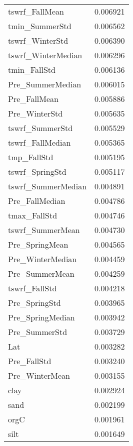 \begin{tabular}{lr}
tswrf_FallMean & 0.006921 \\
tmin_SummerStd & 0.006562 \\
tswrf_WinterStd & 0.006390 \\
tswrf_WinterMedian & 0.006296 \\
tmin_FallStd & 0.006136 \\
Pre_SummerMedian & 0.006015 \\
Pre_FallMean & 0.005886 \\
Pre_WinterStd & 0.005635 \\
tswrf_SummerStd & 0.005529 \\
tswrf_FallMedian & 0.005365 \\
tmp_FallStd & 0.005195 \\
tswrf_SpringStd & 0.005117 \\
tswrf_SummerMedian & 0.004891 \\
Pre_FallMedian & 0.004786 \\
tmax_FallStd & 0.004746 \\
tswrf_SummerMean & 0.004730 \\
Pre_SpringMean & 0.004565 \\
Pre_WinterMedian & 0.004459 \\
Pre_SummerMean & 0.004259 \\
tswrf_FallStd & 0.004218 \\
Pre_SpringStd & 0.003965 \\
Pre_SpringMedian & 0.003942 \\
Pre_SummerStd & 0.003729 \\
Lat & 0.003282 \\
Pre_FallStd & 0.003240 \\
Pre_WinterMean & 0.003155 \\
clay & 0.002924 \\
sand & 0.002199 \\
orgC & 0.001961 \\
silt & 0.001649 \\
\bottomrule
\end{tabular}
